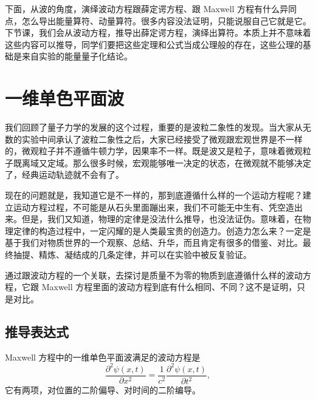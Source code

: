 下面，从波的角度，演绎波动方程跟薛定谔方程、跟 Maxwell 方程有什么异同点，怎么导出能量算符、动量算符。很多内容没法证明，只能说服自己它就是它。
下节课，我们会从波动方程，推导出薛定谔方程，演绎出算符。本质上并不意味着这些内容可以推导，同学们要把这些定理和公式当成公理般的存在，这些公理的基础是来自实验的能量量子化结论。

\section{一维单色平面波}
我们回顾了量子力学的发展的这个过程，重要的是波粒二象性的发现。当大家从无数的实验中间承认了波粒二象性之后，大家已经接受了微观跟宏观世界是不一样的，微观粒子并不遵循牛顿力学，因果率不一样。既是波又是粒子，意味着微观粒子既离域又定域。那么很多时候，宏观能够唯一决定的状态，在微观就不能够决定了，经典运动轨迹就不会有了。

现在的问题就是，我知道它是不一样的，那到底遵循什么样的一个运动方程呢？建立运动方程过程，不可能是从石头里面蹦出来，我们不可能无中生有、凭空造出来。但是，我们又知道，物理的定律是没法什么推导，也没法证伪。意味着，在物理定律的构造过程中，一定闪耀的是人类最宝贵的创造力。创造力怎么来？一定是基于我们对物质世界的一个观察、总结、升华，而且肯定有很多的借鉴、对比。最终抽提、精炼、凝结成的几条定律，并可以在实验中被反复验证。

通过跟波动方程的一个关联，去探讨是质量不为零的物质到底遵循什么样的波动方程，它跟 Maxwell 方程里面的波动方程到底有什么相同、不同？这不是证明，只是对比。

\subsection{推导表达式}
Maxwell 方程中的一维单色平面波满足的波动方程是
\begin{equation}
    \label{eq:mono_wave}
    \frac{\partial^2 \psi(x,t)}{\partial x^2} = \frac{1}{c^2} \frac{\partial^2 \psi(x,t)}{\partial t^2},
\end{equation}
它有两项，对位置的二阶偏导、对时间的二阶编导。

